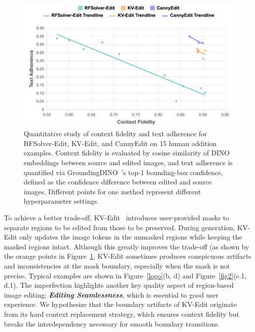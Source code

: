 \documentclass{article}
\begin{document}
\begin{figure}
  \vspace{-12pt} %
    \includegraphics[width=1\linewidth]{figures/tl2.png}
\caption{\small Quantitative study of context fidelity and text adherence for RFSolver-Edit, KV-Edit, and CannyEdit on 15 human addition examples. Context fidelity is evaluated by cosine similarity of DINO \citep{caron2021emerging} embeddings between source and edited images, and text adherence is quantified via GroundingDINO~\citep{liu2024grounding}'s top-1 bounding-box confidence, defined as the confidence difference between edited and source images.  Different points for one method represent different hyperparameter settings.}
    \label{treadline}
      \vspace{-5pt} %
\end{figure}

To achieve a better trade-off, KV-Edit~\citep{zhu2025kv} introduces user-provided masks to separate regions to be edited from those to be preserved.
During generation, KV-Edit only updates the image tokens in the unmasked regions while keeping the masked regions intact.
Although this greatly improves the trade-off (as shown by the orange points in Figure~\ref{treadline}, KV-Edit sometimes produces conspicuous artifacts and inconsistencies at the mask boundary, especially when the mask is not precise.
Typical examples are shown in Figure~\ref{logo}(b, d) and Figure~\ref{fig2}(c.1, d.1).
The imperfection highlights another key quality aspect of region-based image editing: \textbf{\textit{Editing Seamlessness}}, which is essential to good user experience.
{We hypothesize that the boundary artifacts of KV-Edit originate from its hard context replacement strategy, which ensures context fidelity but breaks the interdependency necessary for smooth boundary transitions.}
\end{document}

